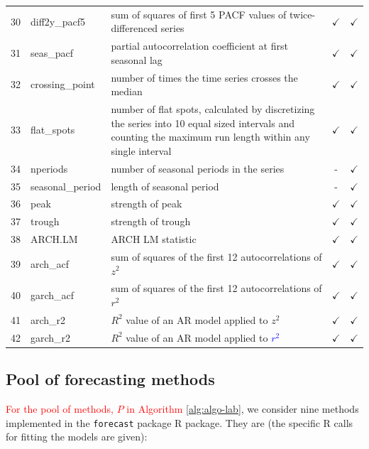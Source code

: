 \documentclass[11pt,a4paper,]{article}
\def\yes{$\checkmark$}
\theoremstyle{definition}
\theoremstyle{definition}
\theoremstyle{definition}
\theoremstyle{remark}
\begin{document}
\begin{table}[!htp]
\begin{tabular}{llp{}cc}
30 & diff2y\_pacf5  & sum of squares of first 5 PACF values of twice-differenced series                       & \yes  & \yes \\
31 & seas\_pacf  & partial autocorrelation coefficient at first seasonal lag                       & \yes  & \yes \\
32 & crossing\_point  & number of times the time series crosses the median                     & \yes  & \yes \\
33 & flat\_spots  & number of flat spots, calculated by discretizing the series into 10 equal sized intervals and counting the maximum run length within any single interval                       & \yes  & \yes \\
34 & nperiods  & number of seasonal periods in the series & -  & \yes \\
35 & seasonal\_period  & length of seasonal period                       & -  & \yes \\
36 & peak  & strength of peak                      & \yes  & \yes \\
37 & trough  & strength of trough                      & \yes  & \yes \\
38 & ARCH.LM  & ARCH LM statistic                      & \yes  & \yes \\
39 & arch\_acf  &    sum of squares of the first 12 autocorrelations of $z^2$               & \yes  & \yes \\
40 & garch\_acf  &  sum of squares of the first 12 autocorrelations of $r^2$                 & \yes  & \yes \\
41 & arch\_r2  &     $R^2$ value of an AR model applied to $z^2$              & \yes  & \yes \\
42 & garch\_r2  &   $R^2$ value of an AR model applied to \textcolor{blue}{$r^2$}               & \yes  & \yes \\
\bottomrule
 \end{tabular}
\end{table}

\subsection{Pool of forecasting
methods}\label{pool-of-forecasting-methods}

\textcolor{red}{For the pool of methods, $P$ in Algorithm }
\ref{alg:algo-lab}, we consider nine methods implemented in the
\texttt{forecast} \autocite{forecast} package R package. They are (the
specific R calls for fitting the models are given):
\end{document}
